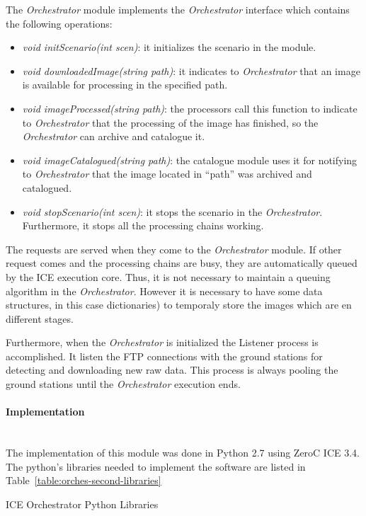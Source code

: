 The \emph{Orchestrator} module implements the \emph{Orchestrator} interface
which contains the following operations:
\begin{itemize}
\item \emph{void initScenario(int scen)}: it initializes the scenario in the
  module.
\item \emph{void downloadedImage(string path)}: it indicates to
  \emph{Orchestrator} that an image is available for processing in the specified
  path.
\item \emph{void imageProcessed(string path)}: the processors call this function
  to indicate to \emph{Orchestrator} that the processing of the image has
  finished, so the \emph{Orchestrator} can archive and catalogue it.
\item \emph{void imageCatalogued(string path)}: the catalogue module uses it for
  notifying to \emph{Orchestrator} that the image located in ``path'' was
  archived and catalogued.
\item \emph{void stopScenario(int scen)}: it stops the scenario in the
  \emph{Orchestrator}. Furthermore, it stops all the processing chains working.
\end{itemize}

The requests are served when they come to the \emph{Orchestrator} module. If
other request comes and the processing chains are busy, they are automatically queued by the
ICE execution core. Thus, it is not necessary to maintain a queuing algorithm in
the \emph{Orchestrator}. However it is necessary to have some data structures, in
this case dictionaries) to temporaly store the images which are en different stages.

Furthermore, when the \emph{Orchestrator} is initialized the Listener process is
accomplished. It listen the \ac{FTP} connections with the ground stations for
detecting and downloading new raw data. This process is always pooling the
ground stations until the \emph{Orchestrator} execution ends.

\paragraph{Implementation}~\\

The implementation of this module was done in Python 2.7 using ZeroC ICE 3.4. The
python's libraries needed to implement the software are listed in
Table~\ref{table:orches-second-libraries}

\begin{table}[hp]
  \centering
  {\small
  
  }
  \caption{ICE Orchestrator Python Libraries}
  \label{table:orches-second-libraries}
\end{table}

